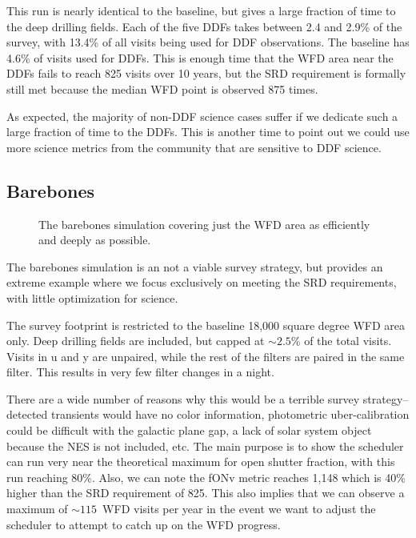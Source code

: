 This run is nearly identical to the baseline, but gives a large fraction of time to the deep drilling fields. Each of the five DDFs takes between 2.4 and 2.9\% of the survey, with 13.4\% of all visits being used for DDF observations. The baseline has 4.6\% of visits used for DDFs.  This is enough time that the WFD area near the DDFs fails to reach 825 visits over 10 years, but the SRD requirement is formally still met because the median WFD point is observed 875 times.

As expected, the majority of non-DDF science cases suffer if we dedicate such a large fraction of time to the DDFs. This is another time to point out we could use more science metrics from the community that are sensitive to DDF science.

\subsection{Barebones}

\begin{figure}
\caption{The barebones simulation covering just the WFD area as efficiently and deeply as possible.}\label{fig:barebones}
\end{figure}


The barebones simulation is an not a viable survey strategy, but provides an extreme example where we focus exclusively on meeting the SRD requirements, with little optimization for science.

The survey footprint is restricted to the baseline 18,000 square degree WFD area only. Deep drilling fields are included, but capped at $\sim2.5$\% of the total visits. Visits in u and y are unpaired, while the rest of the filters are paired in the same filter. This results in very few filter changes in a night. 

There are a wide number of reasons why this would be a terrible survey strategy--detected transients would have no color information, photometric uber-calibration could be difficult with the galactic plane gap, a lack of solar system object because the NES is not included, etc.  The main purpose is to show the scheduler can run very near the theoretical maximum for open shutter fraction, with this run reaching 80\%. Also, we can note the fONv metric reaches 1,148 which is 40\% higher than the SRD requirement of 825. This also implies that we can observe a maximum of $\sim115$\ WFD visits per year in the event we want to adjust the scheduler to attempt to catch up on the WFD progress. 

